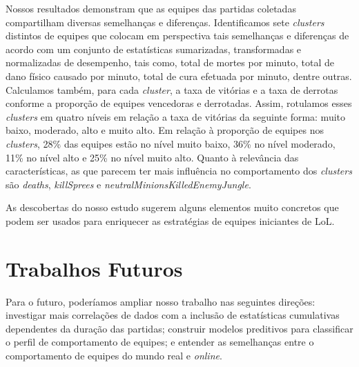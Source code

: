 Nossos resultados demonstram que as equipes das partidas coletadas compartilham diversas semelhanças e diferenças. Identificamos sete \textit{clusters} distintos de equipes que colocam em perspectiva tais semelhanças e diferenças de acordo com um conjunto de estatísticas sumarizadas, transformadas e normalizadas de desempenho, tais como, total de mortes por minuto, total de dano físico causado por minuto, total de cura efetuada por minuto, dentre outras. Calculamos também, para cada \textit{cluster}, a taxa de vitórias e a taxa de derrotas conforme a proporção de equipes vencedoras e derrotadas. Assim, rotulamos esses \textit{clusters} em quatro níveis em relação a taxa de vitórias da seguinte forma: muito baixo, moderado, alto e muito alto. Em relação à proporção de equipes nos \textit{clusters}, 28\% das equipes estão no nível muito baixo, 36\% no nível moderado, 11\% no nível alto e 25\% no nível muito alto. Quanto à relevância das características, as que parecem ter mais influência no comportamento dos \textit{clusters} são \textit{deaths}, \textit{killSprees} e \textit{neutralMinionsKilledEnemyJungle}.

As descobertas do nosso estudo sugerem alguns elementos muito concretos que podem ser usados para enriquecer as estratégias de equipes iniciantes de LoL.

\section{Trabalhos Futuros}
Para o futuro, poderíamos ampliar nosso trabalho nas seguintes direções: investigar mais correlações de dados com a inclusão de estatísticas cumulativas dependentes da duração das partidas; construir modelos preditivos para classificar o perfil de comportamento de equipes; e entender as semelhanças entre o comportamento de equipes do mundo real e \textit{online}.
